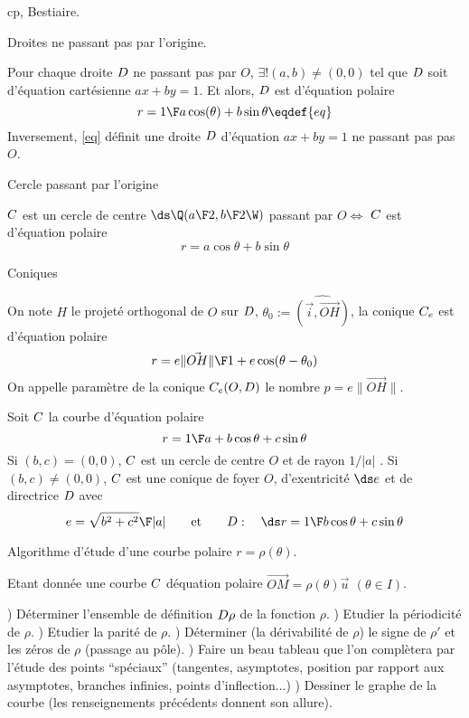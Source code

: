 \Subsection cp, Bestiaire. 
\bigskip

\Concept Droites ne passant pas par l'origine. 

Pour chaque droite $\sc D$ ne passant pas par $O$, $\exists!(a,b)\neq (0,0)$ tel que 
$\sc D$ soit d'\'equation cart\'esienne $ax+by=1$. Et alors, 
$\sc D$ est d'\'equation polaire 
$$
r={1\F a\cos(\theta)+b\sin\theta}\eqdef{eq}
$$
Inversement, \eqref{eq} d\'efinit une droite $\sc D$ d'\'equation $ax+by=1$ ne passant pas pas $O$. 
\bigskip

\Concept Cercle passant par l'origine

\Propriete $\sc C$ est un cercle de centre $\ds\Q({a\F2},{b\F2}\W)$ passant par $O\Longleftrightarrow$ 
$\sc C$ est d'\'equation polaire 
$$
r=a\cos\theta+b\sin\theta
$$

\Concept Coniques 

On note $H$ le projet\'e orthogonal de $O$ sur $\sc D$, 
$\theta_0:=\widehat{(\vec i,\vec{OH})}$, la conique $\sc C_e$ est d'\'equation polaire 
$$
r={e\|\vec {OH}\|\F1+e\cos(\theta-\theta_0)}
$$
On appelle param\`etre de la conique $\sc C_e(O,\sc D)$ le nombre $p=e\|\vec{OH}\|$. 
\bigskip

Soit $\sc C$ la courbe d'\'equation polaire 
$$
r={1\F a+b\cos\theta+c\sin\theta}
$$ 
Si $(b,c)=(0,0)$, $\sc C$ est un cercle de centre $O$ et de rayon $1/|a|$ . \pn
Si $(b,c)\neq(0,0)$, $\sc C$ est une conique de foyer $O$, d'exentricit\'e $\ds e$ 
et de directrice $\sc D$ avec 
$$
e={\sqrt{b^2+c^2}\F|a|}\qquad\mbox{et}\qquad \sc D:\quad \ds r={1\F b\cos\theta+c\sin\theta}
$$

\Concept Algorithme d'\'etude d'une courbe polaire $r=\rho(\theta)$. 

Etant donn\'ee une courbe $\sc C$ d\'equation polaire $\vec{OM}=\rho(\theta)\vec u\ \,(\theta\in I)$.  
\bigskip

) D\'eterminer l'ensemble de d\'efinition $\sc D\rho$ de la fonction $\rho$. ) Etudier la p\'eriodicit\'e de $\rho$. ) Etudier la parit\'e de $\rho$. ) D\'eterminer (la d\'erivabilit\'e de $\rho$) le signe de $\rho'$ 
et les z\'eros de $\rho$ (passage au p\^ole). ) Faire un beau tableau que l'on compl\`etera par l'\'etude des points ``sp\'eciaux'' 
(tangentes, asymptotes, position par rapport aux asymptotes, branches infinies, 
points d'inflection...)
) Dessiner le graphe de la courbe (les renseignements pr\'ec\'edents donnent son allure). 
\bigskip

